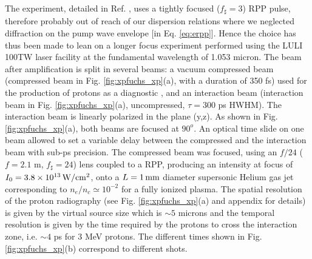 \documentclass[
 reprint,
 superscriptaddress,
 amsmath,amssymb,
 aps,
]{revtex4-1}
\begin{document}
The experiment, detailed in Ref. \cite[]{PRL_Sarri_2011}, uses a tightly focused ($f_\sharp =3$) RPP pulse,  therefore probably out of reach of our dispersion relations where we neglected diffraction  on the pump wave envelope [in Eq. \eqref{eq:erpp}].
Hence the choice has thus been made to lean on 
a longer focus  experiment performed using the LULI 100TW laser facility at the fundamental wavelength of 1.053 micron. The beam after amplification is split in several beams: a vacuum compressed beam (compressed beam in Fig. \ref{fig:xpfuchs_xp}(a), with a duration of 350 fs) used for the production of protons as a diagnostic \cite{RSI_Mackinnon_2004}, and an interaction beam (interaction beam in Fig. \ref{fig:xpfuchs_xp}(a),  uncompressed, $\tau=300$ ps HWHM). The interaction beam is linearly polarized in the plane (y,z). As shown in 
Fig. \ref{fig:xpfuchs_xp}(a), both beams are focused at $90^o$. An optical time slide on one beam allowed to set a variable delay between the compressed  and the interaction beam with sub-ps precision. The compressed beam was focused, using an $f/24$ ($f=2.1$ m, $f_\sharp=24$)  lens coupled to a RPP, producing an intensity at focus of $I_0=3.8\times 10^{13}\, \rm W/cm^2$, onto a $L=1\,\rm mm$ diameter supersonic Helium gas jet corresponding to  $n_e/n_c\simeq 10^{-2}$ for a fully ionized plasma. 
The spatial resolution of the proton radiography (see Fig. \ref{fig:xpfuchs_xp}(a) and appendix for details) is given by the virtual source size which is $\sim 5$ microns \cite{PRL_Cowan_2004} and the temporal resolution is given by the time required by the protons to cross the interaction zone, i.e. $\sim 4$ ps for $3$ MeV protons. The different times shown in Fig. \ref{fig:xpfuchs_xp}(b) correspond to different shots. 
\end{document}
